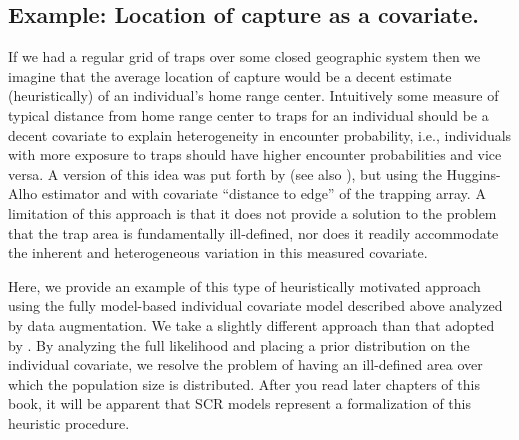 \subsection{Example: Location of capture as a covariate.}

If we had a regular grid of traps over some closed geographic system
then we imagine that the average location of capture would be a decent
estimate (heuristically) of an individual's home range center.
Intuitively some measure of typical distance from home range center to
traps for an individual should be a decent covariate to explain
heterogeneity in encounter probability, i.e., individuals with more
exposure to traps should have higher encounter probabilities and vice
versa.  A version of this idea was put forth by
\citet{boulanger_mclellan:2001} (see also \citet{ivan:2012}), but
using the Huggins-Alho estimator and with covariate ``distance to
edge'' of the trapping array. A limitation of this  approach is
that it does not provide a solution to the problem that the trap area
is fundamentally ill-defined, nor does it readily accommodate the
inherent and heterogeneous variation in this measured covariate.

Here, we provide an example of this type of heuristically motivated
approach using the fully model-based individual covariate model
described above analyzed by data augmentation. We take a slightly
different approach than that adopted by
\citet{boulanger_mclellan:2001}. By analyzing the full likelihood and
placing a prior distribution on the individual covariate, we resolve
the problem of having an ill-defined area over which the population
size is distributed. After you read later chapters of this book, it
will be apparent that SCR models represent a formalization of this
heuristic procedure.

